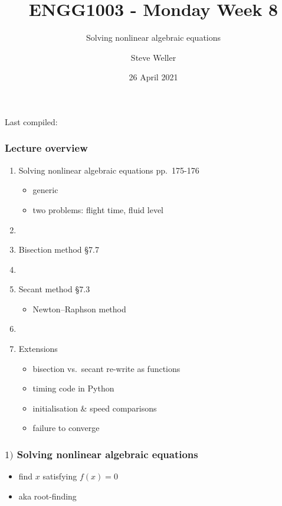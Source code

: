 \documentclass[english,14pt]{beamer}
\title{ENGG1003 - Monday Week 8}
\subtitle{Solving nonlinear algebraic equations }%
\author{Steve Weller}
\institute{University of Newcastle}
\date{26 April 2021}
\newcommand\red[1]{{\color{red} #1}}
\begin{document}
\begin{flushleft}
{\scriptsize Last compiled:~\DTMnow}
\vspace*{-5mm}
\end{flushleft}
\framebreak


\begin{frame}[fragile]

\frametitle{Lecture overview}
\begin{enumerate}
	\item Solving nonlinear algebraic equations \red{pp.~175-176}
	\begin{itemize}
		\item generic
		\item two problems: flight time, fluid level
	\end{itemize}
	
	\item[]
	
	\item Bisection method \red{\S7.7}
	
	\item[]
	
	\item Secant method \red{\S7.3}
	\begin{itemize}
		\item Newton--Raphson method
	\end{itemize}
	
	\item[]
	
	\item Extensions
	\begin{itemize}
		\item bisection vs.~secant re-write as functions
		\item timing code in Python
		\item initialisation \& speed comparisons
		\item failure to converge
	\end{itemize}
	
\end{enumerate}

\end{frame}


\begin{frame}[fragile]

\frametitle{$1)$ Solving nonlinear algebraic equations}

\begin{itemize}
	\item find $x$ satisfying $f(x) = 0$
	\item aka root-finding
\end{itemize}

\end{frame}
\end{document}
